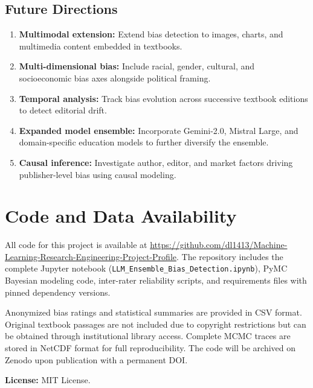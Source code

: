 \documentclass[10pt,letterpaper]{article}
\begin{document}
\subsection{Future Directions}

\begin{enumerate}
  \item \textbf{Multimodal extension:}  Extend bias detection to images, charts,
        and multimedia content embedded in textbooks.
  \item \textbf{Multi-dimensional bias:}  Include racial, gender, cultural, and
        socioeconomic bias axes alongside political framing.
  \item \textbf{Temporal analysis:}  Track bias evolution across successive
        textbook editions to detect editorial drift.
  \item \textbf{Expanded model ensemble:}  Incorporate Gemini-2.0, Mistral Large,
        and domain-specific education models to further diversify the ensemble.
  \item \textbf{Causal inference:}  Investigate author, editor, and market factors
        driving publisher-level bias using causal modeling.
\end{enumerate}

\section*{Code and Data Availability}

All code for this project is available at
\url{https://github.com/dl1413/Machine-Learning-Research-Engineering-Project-Profile}.
The repository includes the complete Jupyter notebook
(\texttt{LLM\_Ensemble\_Bias\_Detection.ipynb}), PyMC Bayesian modeling code,
inter-rater reliability scripts, and requirements files with pinned dependency
versions.

Anonymized bias ratings and statistical summaries are provided in CSV format.
Original textbook passages are not included due to copyright restrictions but
can be obtained through institutional library access.  Complete MCMC traces are
stored in NetCDF format for full reproducibility.  The code will be archived on
Zenodo upon publication with a permanent DOI.

\textbf{License:} MIT License.
\end{document}
